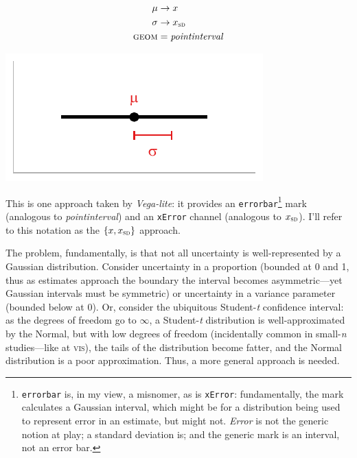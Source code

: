 \documentclass[journal]{vgtc}                     %
\begin{document}
\noindent
\begin{minipage}{.5\columnwidth}
\begin{align*}
\mu &\rightarrow x\\
\sigma &\rightarrow x_\textsc{sd}\\
\textsc{geom} &= \mathit{pointinterval}
\end{align*}
  \end{minipage}%
  \begin{minipage}{.4\columnwidth}
    \centering
    \includegraphics[width=1.2\columnwidth]{figs/2-mean_sd_interval.pdf}
  \end{minipage}

This is one approach taken by \textit{Vega-lite}: it provides an \texttt{errorbar}\footnote{\label{foot:errorbar}\texttt{errorbar} is, in my view, a misnomer, as is \texttt{xError}: fundamentally, the mark calculates a Gaussian interval, which might be for a distribution being used to represent error in an estimate, but might not. \textit{Error} is not the generic notion at play; a standard deviation is; and the generic mark is an interval, not an error bar.} mark (analogous to \textit{pointinterval}) and an \texttt{xError}  channel (analogous to $x_\textsc{sd}$). I'll refer to this notation as the $\{x, x_\textsc{sd}\}$ approach.

The problem, fundamentally, is that not all uncertainty is well-represented by a Gaussian distribution. Consider uncertainty in a proportion (bounded at 0 and 1, thus as estimates approach the boundary the interval becomes asymmetric---yet Gaussian intervals must be symmetric) or uncertainty in a variance parameter (bounded below at 0). Or, consider the ubiquitous Student-\textit{t} confidence interval: as the degrees of freedom go to $\infty$, a Student-\textit{t} distribution is well-approximated by the Normal, but with low degrees of freedom (incidentally common in small-\textit{n} studies---like at \textsc{vis}), the tails of the distribution become fatter, and the Normal distribution is a poor approximation. Thus, a more general approach is needed.
\end{document}
